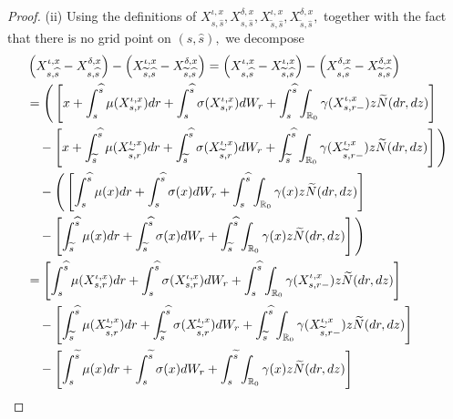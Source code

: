 \documentclass[11pt]{article}
\theoremstyle{theorem}
\theoremstyle{definition}
\newcommand{\bR}{\mathbb{R}}
\newcommand{\1}{{\bf 1}}
\begin{document}
\begin{proof}
(ii) Using the definitions of $X^{\iota, x}_{s,\widehat{s}}, X^{\delta,x}_{s,\widehat{s}}, X^{\iota, x}_{\widetilde{s},\widehat{s}}, X^{\delta, x}_{\widetilde{s},\widehat{s}},$ together with the fact that there is no grid point on $(s, \widehat{s}),$ we decompose
\begin{align*}
 & \left(X^{\iota, x}_{s,\widehat{s}}-X^{\delta,x}_{s,\widehat{s}}\right) - \left(X^{\iota, x}_{\widetilde{s},\widehat{s}}-X^{\delta, x}_{\widetilde{s},\widehat{s}}\right) = \left(X^{\iota, x}_{s,\widehat{s}}-X^{\iota, x}_{\widetilde{s},\widehat{s}} \right) - \left(X^{\delta,x}_{s,\widehat{s}}-X^{\delta, x}_{\widetilde{s},\widehat{s}}\right) \notag\\
 & = \Bigg( \left[x+\int_s^{\widehat{s}} \mu(X_{s, r}^{\iota, x}) dr + \int_s^{\widehat{s}} \sigma(X_{s, r}^{\iota, x}) dW_r+ \int_s^{\widehat{s}} \int_{\bR_0} \gamma (X_{s, r-}^{\iota, x}) z \widetilde{N}(dr, dz) \right] \notag \\
 & \quad  -  \left[x+\int_{\widetilde{s}}^{\widehat{s}} \mu(X_{\widetilde{s}, r}^{\iota, x}) dr + \int_{\widetilde{s}}^{\widehat{s}} \sigma(X_{\widetilde{s}, r}^{\iota, x}) dW_r+ \int_{\widetilde{s}}^{\widehat{s}} \int_{\bR_0} \gamma (X_{\widetilde{s}, r-}^{\iota, x}) z \widetilde{N}(dr, dz) \right]\Bigg ) \notag \\
  & \quad - \Bigg( \left[\int_s^{\widehat{s}} \mu(x) dr + \int_s^{\widehat{s}} \sigma(x) dW_r+ \int_s^{\widehat{s}} \int_{\bR_0} \gamma(x) z \widetilde{N}(dr, dz) \right] \notag \\
    & \quad  -  \left[\int_{\widetilde{s}}^{\widehat{s}} \mu(x) dr + \int_{\widetilde{s}}^{\widehat{s}} \sigma(x) dW_r+ \int_{\widetilde{s}}^{\widehat{s}} \int_{\bR_0} \gamma(x) z \widetilde{N}(dr, dz) \right] \Bigg)  \notag \\
 & = \left[\int_s^{\widehat{s}} \mu(X_{s, r}^{\iota, x}) dr + \int_s^{\widehat{s}} \sigma(X_{s, r}^{\iota, x}) dW_r+ \int_s^{\widehat{s}} \int_{\bR_0} \gamma (X_{s, r-}^{\iota, x}) z \widetilde{N}(dr, dz) \right] \notag \\
 & \quad -  \left[\int_{\widetilde{s}}^{\widehat{s}} \mu(X_{\widetilde{s}, r}^{\iota, x}) dr + \int_{\widetilde{s}}^{\widehat{s}} \sigma(X_{\widetilde{s}, r}^{\iota, x}) dW_r+ \int_{\widetilde{s}}^{\widehat{s}} \int_{\bR_0} \gamma (X_{\widetilde{s}, r-}^{\iota, x}) z \widetilde{N}(dr, dz) \right] \notag \\
    & \quad -  \left[\int_{s}^{\widetilde{s}} \mu(x) dr + \int_{s}^{\widetilde{s}} \sigma(x) dW_r+ \int_{s}^{\widetilde{s}} \int_{\bR_0} \gamma(x) z \widetilde{N}(dr, dz) \right]  \notag \\

\end{align*}
\end{proof}
\end{document}
